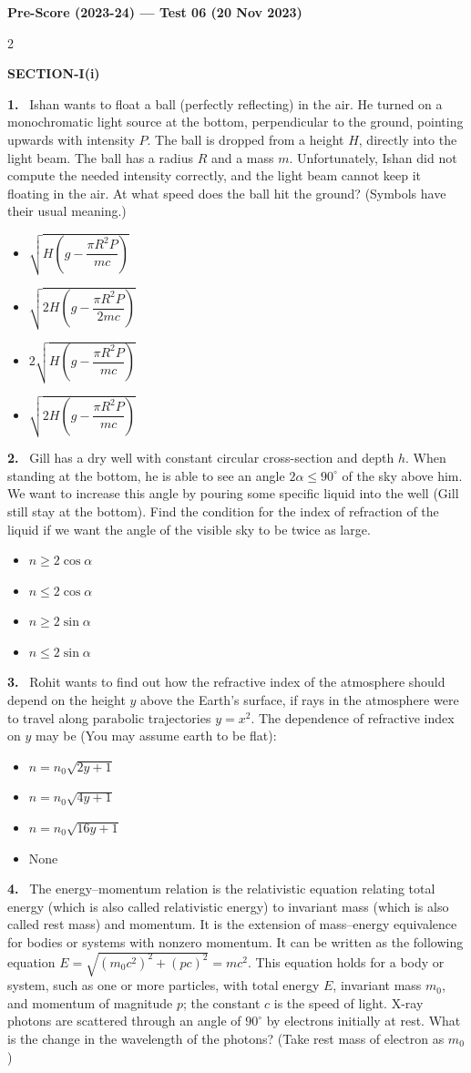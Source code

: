 \documentclass[10pt]{extarticle}
\newcommand{\papersec}[1]{\par\bigskip{\centering\Large\bfseries PAPER-#1\par}\medskip}
\newcommand{\partsec}[2]{\par\medskip\noindent{\large\bfseries PART-#1: #2}\par\smallskip}
\newcommand{\sect}[1]{\par\smallskip\noindent\textbf{#1}\par}
\newcommand{\qn}[1]{\par\smallskip\noindent\textbf{#1.}~}
\newenvironment{qoptions}{\begin{itemize}[leftmargin=1.8em,itemsep=1pt,topsep=2pt,label={}]}{\end{itemize}}
\newcommand{\opt}[2]{\item[(#1)] #2}
\begin{document}
\begin{center}{\Large\bfseries Pre-Score (2023-24) --- Test 06 (20 Nov 2023)}\end{center}\begin{multicols}{2}
\papersec{1}
\partsec{1}{PHYSICS}
\sect{SECTION-I(i)}
\qn{1} Ishan wants to float a ball (perfectly reflecting) in the air. He turned on a monochromatic light source at the bottom, perpendicular to the ground, pointing upwards with intensity $P$. The ball is dropped from a height $H$, directly into the light beam. The ball has a radius $R$ and a mass $m$. Unfortunately, Ishan did not compute the needed intensity correctly, and the light beam cannot keep it floating in the air. At what speed does the ball hit the ground? (Symbols have their usual meaning.)
\begin{qoptions}
\opt{A}{$\sqrt{H\left(g-\dfrac{\pi R^2P}{mc}\right)}$}
\opt{B}{$\sqrt{2H\left(g-\dfrac{\pi R^2P}{2mc}\right)}$}
\opt{C}{$2\sqrt{H\left(g-\dfrac{\pi R^2P}{mc}\right)}$}
\opt{D}{$\sqrt{2H\left(g-\dfrac{\pi R^2P}{mc}\right)}$}
\end{qoptions}
\qn{2} Gill has a dry well with constant circular cross-section and depth $h$. When standing at the bottom, he is able to see an angle $2\alpha\le 90^\circ$ of the sky above him. We want to increase this angle by pouring some specific liquid into the well (Gill still stay at the bottom). Find the condition for the index of refraction of the liquid if we want the angle of the visible sky to be twice as large.
\begin{qoptions}
\opt{A}{$n\ge 2\cos\alpha$}
\opt{B}{$n\le 2\cos\alpha$}
\opt{C}{$n\ge 2\sin\alpha$}
\opt{D}{$n\le 2\sin\alpha$}
\end{qoptions}
\qn{3} Rohit wants to find out how the refractive index of the atmosphere should depend on the height $y$ above the Earth's surface, if rays in the atmosphere were to travel along parabolic trajectories $y=x^2$. The dependence of refractive index on $y$ may be (You may assume earth to be flat):
\begin{qoptions}
\opt{A}{$n=n_0\sqrt{2y+1}$}
\opt{B}{$n=n_0\sqrt{4y+1}$}
\opt{C}{$n=n_0\sqrt{16y+1}$}
\opt{D}{None}
\end{qoptions}
\qn{4} The energy--momentum relation is the relativistic equation relating total energy (which is also called relativistic energy) to invariant mass (which is also called rest mass) and momentum. It is the extension of mass--energy equivalence for bodies or systems with nonzero momentum. It can be written as the following equation $E=\sqrt{(m_0c^2)^2+(pc)^2}=mc^2$. This equation holds for a body or system, such as one or more particles, with total energy $E$, invariant mass $m_0$, and momentum of magnitude $p$; the constant $c$ is the speed of light. X-ray photons are scattered through an angle of $90^\circ$ by electrons initially at rest. What is the change in the wavelength of the photons? (Take rest mass of electron as $m_0$)

\end{multicols}
\end{document}
